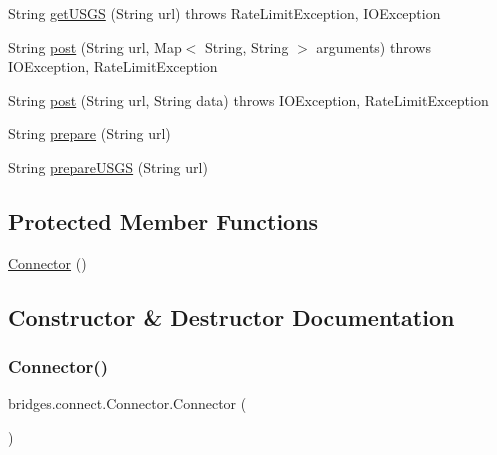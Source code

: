 \begin{DoxyCompactItemize}
\item 
String \mbox{\hyperlink{classbridges_1_1connect_1_1_connector_a1781405c9b38c338bce042bf7ff23eaf}{get\+U\+S\+GS}} (String url)  throws Rate\+Limit\+Exception, I\+O\+Exception 
\item 
String \mbox{\hyperlink{classbridges_1_1connect_1_1_connector_a88e465aed707d59b96958dcc946ff6b4}{post}} (String url, Map$<$ String, String $>$ arguments)  throws I\+O\+Exception, Rate\+Limit\+Exception 
\item 
String \mbox{\hyperlink{classbridges_1_1connect_1_1_connector_a4b8978743a8c230b86500f5a00cb2697}{post}} (String url, String data)  throws I\+O\+Exception, 		\+Rate\+Limit\+Exception 
\item 
String \mbox{\hyperlink{classbridges_1_1connect_1_1_connector_a507ee5a9d8c812ffd4629cbd22f27373}{prepare}} (String url)
\item 
String \mbox{\hyperlink{classbridges_1_1connect_1_1_connector_aa0201e2569358ff906d3c14d654711e5}{prepare\+U\+S\+GS}} (String url)
\end{DoxyCompactItemize}
\subsection*{Protected Member Functions}
\begin{DoxyCompactItemize}
\item 
\mbox{\hyperlink{classbridges_1_1connect_1_1_connector_a167800699b2d191bd625d9c8c8cd9e6f}{Connector}} ()
\end{DoxyCompactItemize}


\subsection{Constructor \& Destructor Documentation}
\mbox{\label{classbridges_1_1connect_1_1_connector_a167800699b2d191bd625d9c8c8cd9e6f}} 
\subsubsection{\texorpdfstring{Connector()}{Connector()}}
{\footnotesize\ttfamily bridges.\+connect.\+Connector.\+Connector (\begin{DoxyParamCaption}{ }\end{DoxyParamCaption})\hspace{0.3cm}{\ttfamily [protected]}}



